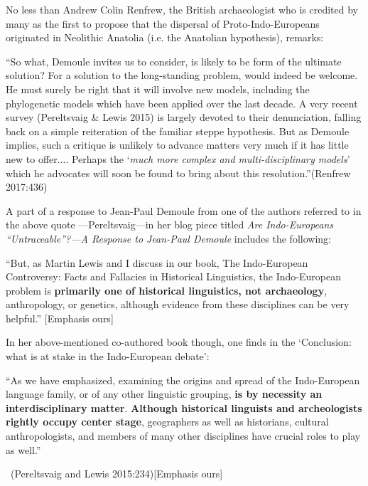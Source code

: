 No less than Andrew Colin Renfrew, the British archaeologist who is credited by many as the first to propose that the dispersal of Proto-Indo-Europeans originated in Neolithic Anatolia (i.e. the Anatolian hypothesis), remarks:

\begin{myquote}
“So what, Demoule invites us to consider, is likely to be form of the ultimate solution? For a solution to the long-standing problem, would indeed be welcome. He must surely be right that it will involve new models, including the phylogenetic models which have been applied over the last decade. A very recent survey (Pereltsvaig \& Lewis 2015) is largely devoted to their denunciation, falling back on a simple reiteration of the familiar steppe hypothesis. But as Demoule implies, such a critique is unlikely to advance matters very much if it has little new to offer.... Perhaps the ‘\textit{much more complex and multi-disciplinary models}’ which he advocates will soon be found to bring about this resolution.”\hfill (Renfrew 2017:436)
\end{myquote}

A part of a response to Jean-Paul Demoule from one of the authors referred to in the above quote —Pereltsvaig—in her blog piece titled \textit{Are Indo-Europeans “Untraceable”?—A Response to Jean-Paul Demoule} includes the following:

\begin{myquote}
“But, as Martin Lewis and I discuss in our book, The Indo-European Controversy: Facts and Fallacies in Historical Linguistics, the Indo-European problem is \textbf{primarily one of historical linguistics, not archaeology}, anthropology, or genetics, although evidence from these disciplines can be very helpful.” [Emphasis ours]
\end{myquote}

In her above-mentioned co-authored book though, one finds in the ‘Conclusion: what is at stake in the Indo-European debate’:

\begin{myquote}
“As we have emphasized, examining the origins and spread of the Indo-European language family, or of any other linguistic grouping, \textbf{is by necessity an interdisciplinary matter}. \textbf{Although historical linguists and archeologists rightly occupy center stage}, geographers as well as historians, cultural anthropologists, and members of many other disciplines have crucial roles to play as well.”

~\hfill (Pereltsvaig and Lewis 2015:234)[Emphasis ours]
\end{myquote}

